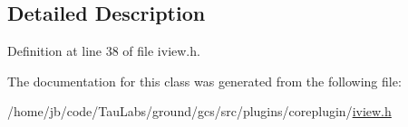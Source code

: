 \subsection{\-Detailed \-Description}


\-Definition at line 38 of file iview.\-h.



\-The documentation for this class was generated from the following file\-:\begin{DoxyCompactItemize}
\item 
/home/jb/code/\-Tau\-Labs/ground/gcs/src/plugins/coreplugin/\hyperlink{iview_8h}{iview.\-h}\end{DoxyCompactItemize}
